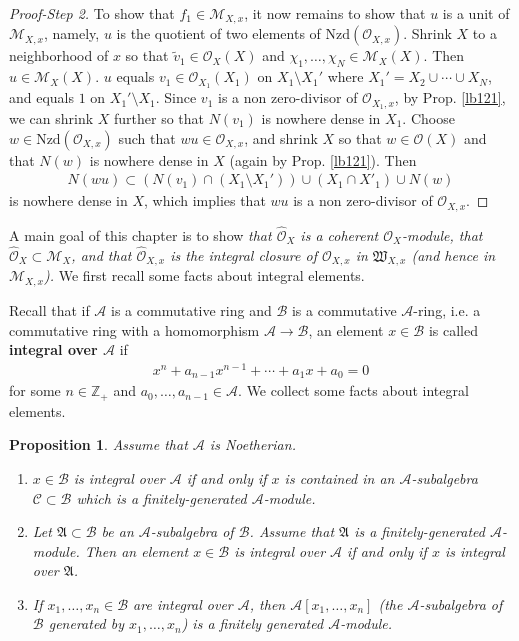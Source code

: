 \documentclass[12pt,b5paper,notitlepage]{report}
\theoremstyle{definition}
\theoremstyle{plain}
\newtheorem{pp}[df]{Proposition}
\newcommand{\fk}{\mathfrak}
\newcommand{\mc}{\mathcal}
\newcommand{\wtd}{\widetilde}
\newcommand{\scr}{\mathscr}
\newcommand{\Zbb}{\mathbb Z}
\newcommand{\Nzd}{\mathrm{Nzd}}
\newcommand{\Owht}{\widehat{\scr O}}
\numberwithin{equation}{section}
\begin{document}
\begin{proof}[Proof-Step 2]
To show that $f_1\in\scr M_{X,x}$, it now remains to show that $u$ is a unit of $\scr M_{X,x}$, namely, $u$ is the quotient of two elements of $\Nzd(\scr O_{X,x})$. Shrink $X$ to a neighborhood of $x$ so that $\wtd v_1\in\scr O_X(X)$ and $\chi_1,\dots,\chi_N\in\scr M_X(X)$. Then $u\in\scr M_X(X)$. $u$ equals $v_1\in\scr O_{X_1}(X_1)$ on $X_1\setminus X_1'$ where $X_1'=X_2\cup\cdots\cup X_N$, and equals $1$ on $X_1'\setminus X_1$. Since $v_1$ is a non zero-divisor of $\scr O_{X_1,x}$, by Prop. \ref{lb121}, we can shrink $X$ further so that $N(v_1)$ is nowhere dense in $X_1$. Choose $w\in\Nzd(\scr O_{X,x})$ such that $wu\in\scr O_{X,x}$, and shrink $X$ so that $w\in\scr O(X)$ and that $N(w)$ is nowhere dense in $X$ (again by Prop. \ref{lb121}). Then
\begin{align*}
N(wu)\subset (N(v_1)\cap(X_1\setminus X_1'))\cup (X_1\cap X'_1)\cup N(w)
\end{align*}
is nowhere dense in $X$, which implies that $wu$ is a non zero-divisor of $\scr O_{X,x}$.
\end{proof}










A main goal of this chapter is to show \emph{\color{red}that $\Owht_X$ is a coherent $\scr O_X$-module, that $\Owht_X\subset\scr M_X$, and that $\Owht_{X,x}$ is the integral closure of $\scr O_{X,x}$ in $\fk W_{X,x}$ (and hence in $\scr M_{X,x}$).} We first recall some facts about integral elements.


Recall that if $\mc A$ is a commutative ring and $\mc B$ is a commutative $\mc A$-ring, i.e. a commutative ring with a homomorphism $\mc A\rightarrow\mc B$, an element $x\in\mc B$ is called \textbf{integral over $\mc A$}  if
\begin{align}
x^n+a_{n-1}x^{n-1}+\cdots+a_1x+a_0=0
\end{align}
for some $n\in\Zbb_+$ and $a_0,\dots,a_{n-1}\in\mc A$. We collect some facts about integral elements.


\begin{pp}\label{lb188}
Assume that $\mc A$ is Noetherian.
\begin{enumerate}
\item $x\in\mc B$ is integral over $\mc A$ if and only if $x$ is contained in an $\mc A$-subalgebra $\mc C\subset\mc B$  which is a finitely-generated $\mc A$-module.

\item Let $\fk A\subset \mc B$ be an $\mc A$-subalgebra of $\mc B$. Assume that $\fk A$ is a finitely-generated $\mc A$-module. Then an element $x\in \mc B$ is integral over $\mc A$ if and only if $x$ is integral over $\fk A$.

\item If $x_1,\dots,x_n\in\mc B$ are integral over $\mc A$, then $\mc A[x_1,\dots,x_n]$ (the $\mc A$-subalgebra of $\mc B$ generated by $x_1,\dots,x_n$) is a finitely generated $\mc A$-module.
\end{enumerate}
\end{pp}
\end{document}
